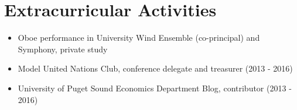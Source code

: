 \section{Extracurricular Activities}
\begin{itemize}
	\item Oboe performance in University Wind Ensemble (co-principal) and Symphony, private study
    \item Model United Nations Club, conference delegate and treasurer (2013 - 2016)
    \item University of Puget Sound Economics Department Blog, contributor (2013 - 2016)
\end{itemize}
